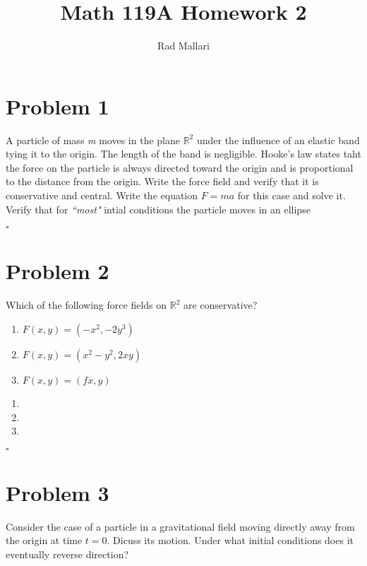 \documentclass[11pt]{article}
\title{Math 119A Homework 2}
\author{Rad Mallari}
\newcommand{\R}{\mathbb{R}}
\newenvironment{proof}{\noindent{\bf Proof.}}{\hfill $\square$\medskip}
\begin{document}
\maketitle

\section{Problem 1}
A particle of mass \textit{m} moves in the plane $\R^{2}$ under the influence of an elastic band tying it to the origin.
The length of the band is negligible. Hooke's law states taht the force on the particle is always directed toward
the origin and is proportional to the distance from the origin. Write the force field and verify that it is
conservative and central. Write the equation $F=ma$ for this case and solve it. Verify that for \textit{``most"} intial
conditions the particle moves in an ellipse

\begin{proof}
    
\end{proof}

\section{Problem 2}
Which of the following force fields on $\R^{2}$ are conservative?
\begin{enumerate}[label=\textbf{(\alph*)}]
    \item $F(x,y)=(-x^{2},-2y^{3})$
    \item $F(x,y)=(x^{2}-y^{2},2xy)$
    \item $F(x,y)=(fx,y)$
\end{enumerate}

\begin{proof}
    \begin{enumerate}[label=\textbf{(\alph*)}]
        \item
        \item 
        \item
    \end{enumerate}
\end{proof}

\section{Problem 3}
Consider the case of a particle in a gravitational field moving directly away from the origin at time $t=0$. Dicuss its 
motion. Under what initial conditions does it eventually reverse direction?
\end{document}
